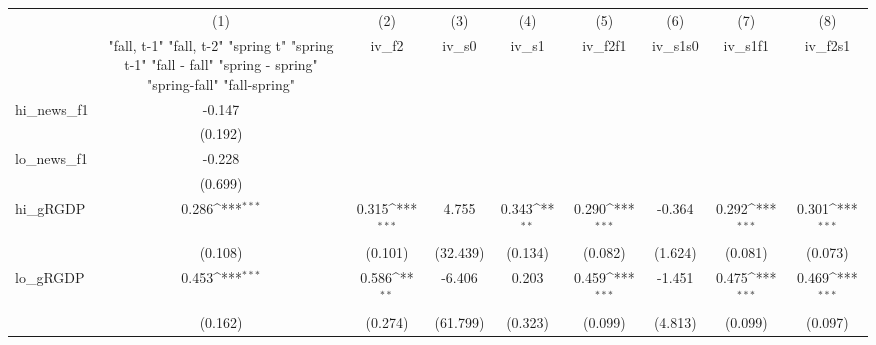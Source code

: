 {
\def\sym#1{\ifmmode^{#1}\else\(^{#1}\)\fi}
\begin{tabular}{l*{8}{c}}
\toprule
            &\multicolumn{1}{c}{(1)}&\multicolumn{1}{c}{(2)}&\multicolumn{1}{c}{(3)}&\multicolumn{1}{c}{(4)}&\multicolumn{1}{c}{(5)}&\multicolumn{1}{c}{(6)}&\multicolumn{1}{c}{(7)}&\multicolumn{1}{c}{(8)}\\
            &\multicolumn{1}{c}{  "fall, t-1" "fall, t-2" "spring t" "spring t-1"  "fall - fall" "spring - spring" "spring-fall" "fall-spring" }&\multicolumn{1}{c}{iv\_f2}&\multicolumn{1}{c}{iv\_s0}&\multicolumn{1}{c}{iv\_s1}&\multicolumn{1}{c}{iv\_f2f1}&\multicolumn{1}{c}{iv\_s1s0}&\multicolumn{1}{c}{iv\_s1f1}&\multicolumn{1}{c}{iv\_f2s1}\\
\midrule
hi\_news\_f1  &      -0.147         &                     &                     &                     &                     &                     &                     &                     \\
            &     (0.192)         &                     &                     &                     &                     &                     &                     &                     \\
\addlinespace
lo\_news\_f1  &      -0.228         &                     &                     &                     &                     &                     &                     &                     \\
            &     (0.699)         &                     &                     &                     &                     &                     &                     &                     \\
\addlinespace
hi\_gRGDP    &       0.286\sym{***}&       0.315\sym{***}&       4.755         &       0.343\sym{**} &       0.290\sym{***}&      -0.364         &       0.292\sym{***}&       0.301\sym{***}\\
            &     (0.108)         &     (0.101)         &    (32.439)         &     (0.134)         &     (0.082)         &     (1.624)         &     (0.081)         &     (0.073)         \\
\addlinespace
lo\_gRGDP    &       0.453\sym{***}&       0.586\sym{**} &      -6.406         &       0.203         &       0.459\sym{***}&      -1.451         &       0.475\sym{***}&       0.469\sym{***}\\
            &     (0.162)         &     (0.274)         &    (61.799)         &     (0.323)         &     (0.099)         &     (4.813)         &     (0.099)         &     (0.097)         \\

\end{tabular}}
